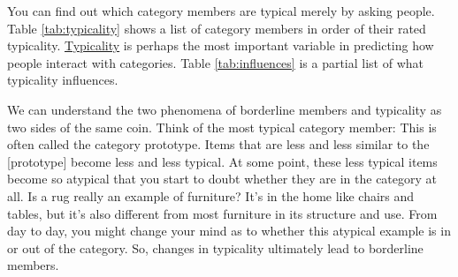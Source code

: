 \documentclass[
]{krantz}
\begin{document}
You can find out which category members are typical merely by asking people. Table \ref{tab:typicality} shows a list of category members in order of their rated typicality. \hyperref[typicality]{Typicality} is perhaps the most important variable in predicting how people interact with categories. Table \ref{tab:influences} is a partial list of what typicality influences.

We can understand the two phenomena of borderline members and typicality as two sides of the same coin. Think of the most typical category member: This is often called the category prototype. Items that are less and less similar to the {[}prototype{]} become less and less typical. At some point, these less typical items become so atypical that you start to doubt whether they are in the category at all. Is a rug really an example of furniture? It's in the home like chairs and tables, but it's also different from most furniture in its structure and use. From day to day, you might change your mind as to whether this atypical example is in or out of the category. So, changes in typicality ultimately lead to borderline members.
\end{document}
